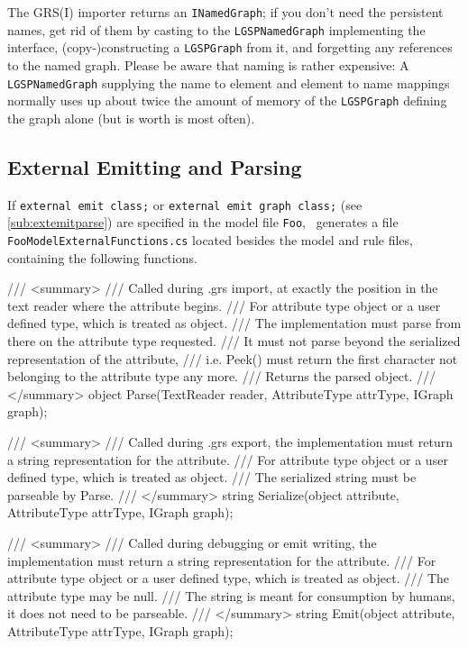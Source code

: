 The GRS(I) importer returns an \texttt{INamedGraph};
if you don't need the persistent names, get rid of them by casting to the \texttt{LGSPNamedGraph} implementing the interface, (copy-)constructing a \texttt{LGSPGraph} from it, and forgetting any references to the named graph.
Please be aware that naming is rather expensive:
A \texttt{LGSPNamedGraph} supplying the name to element and element to name mappings normally uses up about twice the amount of memory of the \texttt{LGSPGraph} defining the graph alone (but is worth is most often).

\subsection*{External Emitting and Parsing}\label{sub:apiextemitparse}
If \texttt{external emit class;} or \texttt{external emit graph class;} (see \ref{sub:extemitparse}) are specified in the model file \texttt{Foo}, \GrG~generates a file \texttt{FooModelExternalFunctions.cs} located besides the model and rule files,
containing the following functions.

\begin{csharplet}
/// <summary>
/// Called during .grs import, at exactly the position in the text reader where the attribute begins.
/// For attribute type object or a user defined type, which is treated as object.
/// The implementation must parse from there on the attribute type requested.
/// It must not parse beyond the serialized representation of the attribute, 
/// i.e. Peek() must return the first character not belonging to the attribute type any more.
/// Returns the parsed object.
/// </summary>
object Parse(TextReader reader, AttributeType attrType, IGraph graph);

/// <summary>
/// Called during .grs export, the implementation must return a string representation for the attribute.
/// For attribute type object or a user defined type, which is treated as object.
/// The serialized string must be parseable by Parse.
/// </summary>
string Serialize(object attribute, AttributeType attrType, IGraph graph);

/// <summary>
/// Called during debugging or emit writing, the implementation must return a string representation for the attribute.
/// For attribute type object or a user defined type, which is treated as object.
/// The attribute type may be null.
/// The string is meant for consumption by humans, it does not need to be parseable.
/// </summary>
string Emit(object attribute, AttributeType attrType, IGraph graph);
\end{csharplet}

